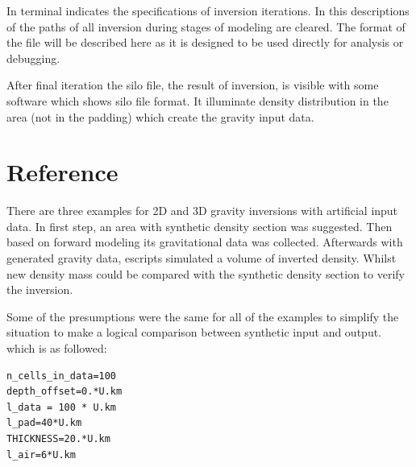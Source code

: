  In terminal indicates the specifications of inversion iterations. In this descriptions of the paths of all inversion during stages of modeling are cleared. The format of the file will be described here as it is designed to be used directly for analysis or debugging.

After final iteration the silo file, the result of inversion, is visible with some software which shows silo file format. It illuminate density distribution in the area (not in the padding) which create the gravity input data.

\section{Reference}

There are three examples for 2D and 3D gravity inversions with artificial input data.
In first step, an area with synthetic density section was suggested. Then based on forward modeling its gravitational data was collected. Afterwards with generated gravity data, escripts simulated a volume of inverted density. Whilst new density mass could be compared with the synthetic density section to verify the inversion.

Some of the presumptions were the same for all of the examples to simplify the situation to make a logical comparison between synthetic input and output. which is as followed:

\begin{verbatim}
n_cells_in_data=100
depth_offset=0.*U.km
l_data = 100 * U.km
l_pad=40*U.km
THICKNESS=20.*U.km
l_air=6*U.km
\end{verbatim}

